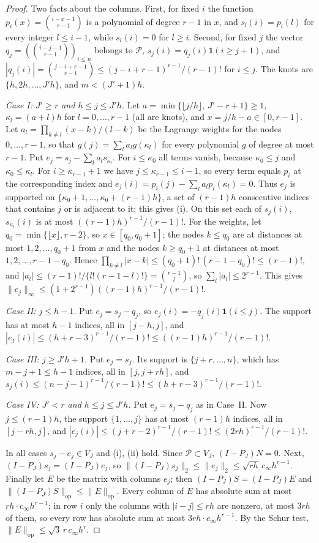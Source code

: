 \documentclass[11pt]{article}
\theoremstyle{definition}
\theoremstyle{remark}
\newcommand{\cP}{\mathcal P}
\newcommand{\ind}{\mathbf 1}
\newcommand{\op}{\mathrm{op}}
\begin{document}
\begin{proof}
Two facts about the columns. First, for fixed $i$ the function $p_i(x)=\binom{i-x-1}{r-1}$ is a polynomial of degree $r-1$ in $x$, and $s_l(i)=p_i(l)$ for every integer $l\le i-1$, while $s_l(i)=0$ for $l\ge i$. Second, for fixed $j$ the vector $q_j=(\binom{i-j-1}{r-1})_{i\le n}$ belongs to $\cP$, $s_j(i)=q_j(i)\ind(i\ge j+1)$, and $|q_j(i)|=\binom{j-i+r-1}{r-1}\le(j-i+r-1)^{r-1}/(r-1)!$ for $i\le j$. The knots are $\{h,2h,\dots,J'h\}$, and $m<(J'+1)h$.

\emph{Case I: $J'\ge r$ and $h\le j\le J'h$.} Let $a=\min\{\lfloor j/h\rfloor,\,J'-r+1\}\ge1$, $\kappa_l=(a+l)h$ for $l=0,\dots,r-1$ (all are knots), and $x=j/h-a\in[0,r-1]$. Let $a_l=\prod_{k\ne l}(x-k)/(l-k)$ be the Lagrange weights for the nodes $0,\dots,r-1$, so that $g(j)=\sum_la_lg(\kappa_l)$ for every polynomial $g$ of degree at most $r-1$. Put $e_j=s_j-\sum_la_ls_{\kappa_l}$. For $i\le\kappa_0$ all terms vanish, because $\kappa_0\le j$ and $\kappa_0\le\kappa_l$. For $i\ge\kappa_{r-1}+1$ we have $j\le\kappa_{r-1}\le i-1$, so every term equals $p_i$ at the corresponding index and $e_j(i)=p_i(j)-\sum_la_lp_i(\kappa_l)=0$. Thus $e_j$ is supported on $\{\kappa_0+1,\dots,\kappa_0+(r-1)h\}$, a set of $(r-1)h$ consecutive indices that contains $j$ or is adjacent to it; this gives (i). On this set each of $s_j(i)$, $s_{\kappa_l}(i)$ is at most $((r-1)h)^{r-1}/(r-1)!$. For the weights, let $q_0=\min\{\lfloor x\rfloor,r-2\}$, so $x\in[q_0,q_0+1]$; the nodes $k\le q_0$ are at distances at most $1,2,\dots,q_0+1$ from $x$ and the nodes $k\ge q_0+1$ at distances at most $1,2,\dots,r-1-q_0$. Hence $\prod_{k\ne l}|x-k|\le(q_0+1)!\,(r-1-q_0)!\le(r-1)!$, and $|a_l|\le(r-1)!/\{l!(r-1-l)!\}=\binom{r-1}l$, so $\sum_l|a_l|\le2^{r-1}$. This gives $\|e_j\|_\infty\le(1+2^{r-1})((r-1)h)^{r-1}/(r-1)!$.

\emph{Case II: $j\le h-1$.} Put $e_j=s_j-q_j$, so $e_j(i)=-q_j(i)\ind(i\le j)$. The support has at most $h-1$ indices, all in $[j-h,j]$, and $|e_j(i)|\le(h+r-3)^{r-1}/(r-1)!\le((r-1)h)^{r-1}/(r-1)!$.

\emph{Case III: $j\ge J'h+1$.} Put $e_j=s_j$. Its support is $\{j+r,\dots,n\}$, which has $m-j+1\le h-1$ indices, all in $[j,j+rh]$, and $s_j(i)\le(n-j-1)^{r-1}/(r-1)!\le(h+r-3)^{r-1}/(r-1)!$.

\emph{Case IV: $J'<r$ and $h\le j\le J'h$.} Put $e_j=s_j-q_j$ as in Case~II. Now $j\le(r-1)h$, the support $\{1,\dots,j\}$ has at most $(r-1)h$ indices, all in $[j-rh,j]$, and $|e_j(i)|\le(j+r-2)^{r-1}/(r-1)!\le(2rh)^{r-1}/(r-1)!$.

In all cases $s_j-e_j\in V_J$ and (i), (ii) hold. Since $\cP\subset V_J$, $(I-P_J)N=0$. Next, $(I-P_J)s_j=(I-P_J)e_j$, so $\|(I-P_J)s_j\|_2\le\|e_j\|_2\le\sqrt{rh}\,c_\infty h^{r-1}$. Finally let $E$ be the matrix with columns $e_j$; then $(I-P_J)S=(I-P_J)E$ and $\|(I-P_J)S\|_{\op}\le\|E\|_{\op}$. Every column of $E$ has absolute sum at most $rh\cdot c_\infty h^{r-1}$; in row $i$ only the columns with $|i-j|\le rh$ are nonzero, at most $3rh$ of them, so every row has absolute sum at most $3rh\cdot c_\infty h^{r-1}$. By the Schur test, $\|E\|_{\op}\le\sqrt{3}\,r\,c_\infty h^{r}$.
\end{proof}
\end{document}

